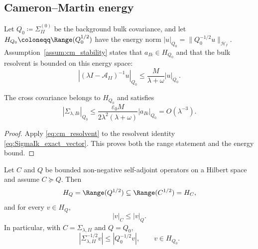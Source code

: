 \subsection{Cameron--Martin energy}

Let $Q_0\coloneqq\Sigma_{II}^{(0)}$ be the background bulk covariance, and let
$H_{Q_0}\coloneqq\Range(Q_0^{1/2})$ have the energy norm
$|u|_{Q_0}=\|Q_0^{-1/2}u\|_{\mathcal{H}_I}$.  Assumption~\ref{assum:cm_stability}
states that $a_{Ik}\in H_{Q_0}$ and that the bulk resolvent is bounded on this
energy space:
\begin{equation}
  |(\lambda I-\mathcal{A}_{II})^{-1}u|_{Q_0}
  \le \frac{M}{\lambda+\omega}|u|_{Q_0}.
  \label{eq:cm_resolvent}
\end{equation}

\begin{lemma}
\label{lem:finite_energy_leakage}
The cross covariance belongs to $H_{Q_0}$ and satisfies
\begin{equation}
 |\Sigma_{\lambda,Ik}|_{Q_0}
 \le
 \frac{\varepsilon_0M}{2\lambda^2(\lambda+\omega)}
 |a_{Ik}|_{Q_0}
 =O(\lambda^{-3}).
 \label{eq:cross_energy}
\end{equation}
\end{lemma}

\begin{proof}
Apply \eqref{eq:cm_resolvent} to the resolvent identity
\eqref{eq:SigmaIk_exact_vector}.  This proves both the range statement and the
energy bound.
\end{proof}

\begin{lemma}
\label{lem:form_domain_energy_domination}
Let $C$ and $Q$ be bounded non-negative self-adjoint operators on a Hilbert
space and assume $C\succeq Q$.  Then
\begin{equation}
  H_Q=\Range(Q^{1/2})\subseteq \Range(C^{1/2})=H_C,
  \label{eq:range_inclusion_CQ}
\end{equation}
and for every $v\in H_Q$,
\begin{equation}
  |v|_C\le |v|_Q.
  \label{eq:energy_domination_CQ}
\end{equation}
In particular, with $C=\Sigma_{\lambda,II}$ and $Q=Q_0$,
\begin{equation}
  |\Sigma_{\lambda,II}^{-1/2}v|
  \le |Q_0^{-1/2}v|,
  \qquad v\in H_{Q_0}.
  \label{eq:Sigma_energy_dominated_by_Q0}
\end{equation}
\end{lemma}


